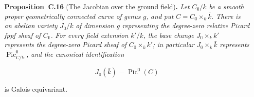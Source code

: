 \documentclass[11pt]{article}
\newenvironment{bpstatement}[2]{\par\addvspace{0.6\baselineskip}\noindent\textbf{#1}#2\textbf{.}\enspace\ignorespaces}
  {\par\addvspace{0.4\baselineskip}}
\newenvironment{bpstatementit}[2]{\begin{bpstatement}{#1}{#2}\itshape\ignorespaces}{\end{bpstatement}}
\begin{document}
\label{bp49}%
\begin{bpstatementit}{Proposition~C.16}{ (The Jacobian over the ground field)}
Let \(C_0/k\) be a smooth proper geometrically connected curve of genus \(g\), and put \(C=C_0\times_k\bar k\). There is an abelian variety \(J_0/k\) of dimension \(g\) representing the degree-zero relative Picard fppf sheaf of \(C_0\). For every field extension \(k'/k\), the base change \(J_0\times_kk'\) represents the degree-zero Picard sheaf of \(C_0\times_kk'\); in particular \(J_0\times_k\bar k\) represents \(\operatorname{Pic}^0_{C/\bar k}\), and the canonical identification

\[
J_0(\bar k)=\operatorname{Pic}^0(C)
\]

is Galois-equivariant.
\end{bpstatementit}
\end{document}
